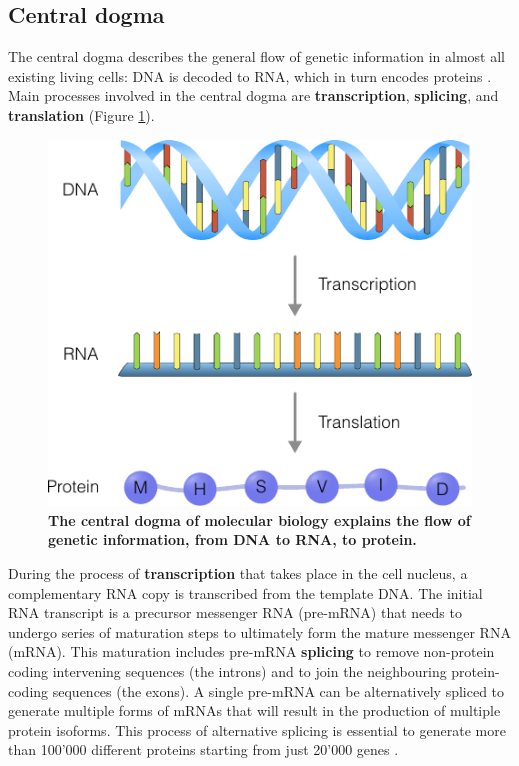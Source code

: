 \subsection{Central dogma}
The central dogma describes the general flow of genetic information in almost all existing living cells: DNA is decoded to RNA, which in turn encodes proteins \cite{strachan_humanmoleculargenetics_2011}. Main processes involved in the central dogma are \textbf{transcription}, \textbf{splicing}, and \textbf{translation} (Figure \ref{fig:centraldogma}). 

\begin{figure}[htb!]
	\centering
	\includegraphics[width=.8\linewidth]{fig/central_dogma.pdf}
	\caption{	
		\textbf{The central dogma of molecular biology explains the flow of genetic information, from DNA to RNA, to protein.}
	}
	\label{fig:centraldogma}
\end{figure}

During the process of \textbf{transcription} that takes place in the cell nucleus, a complementary RNA copy is transcribed from the template DNA. The initial RNA transcript is a precursor messenger RNA (pre-mRNA) that needs to undergo series of maturation steps to ultimately form the mature messenger RNA (mRNA). This maturation includes pre-mRNA \textbf{splicing} to remove non-protein coding intervening sequences (the introns) and to join the neighbouring protein-coding sequences (the exons). A single pre-mRNA can be alternatively spliced to generate multiple forms of mRNAs that will result in the production of multiple protein isoforms. This process of alternative splicing is essential to generate more than 100'000 different proteins starting from just 20'000 genes \cite{nilsen_expansioneukaryoticproteome_2010}.

